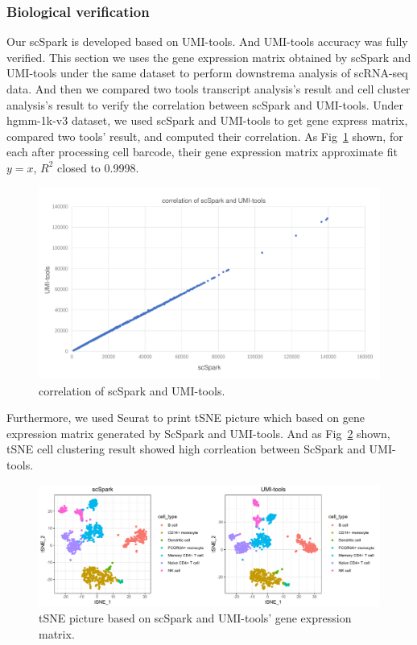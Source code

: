\documentclass[runningheads]{llncs}
\begin{document}
\subsubsection{Biological verification}
Our scSpark is developed based on UMI-tools.
And UMI-tools accuracy was fully verified.
This section we uses the gene expression matrix obtained by scSpark and UMI-tools under the same dataset to perform downstrema analysis of scRNA-seq data.
And then we compared two tools transcript analysis's result and cell cluster analysis's result to verify the correlation between scSpark and UMI-tools.
Under hgmm-1k-v3 dataset, we used scSpark and UMI-tools to get gene express matrix, compared two tools' result, and computed their correlation.
As Fig~\ref{fig9} shown, for each after processing cell barcode, their gene expression matrix approximate fit $y=x$, $R^{2}$ closed to 0.9998.
\begin{figure}
  \includegraphics[width=\textwidth]{fig9.pdf}
  \caption{correlation of scSpark and UMI-tools.} \label{fig9}
\end{figure}
Furthermore, we used Seurat to print tSNE picture which based on gene expression matrix generated by ScSpark and UMI-tools.
And as Fig~\ref{fig10} shown, tSNE cell clustering result showed high corrleation between ScSpark and UMI-tools.
\begin{figure}
  \includegraphics[width=\textwidth]{fig10.pdf}
  \caption{tSNE picture based on scSpark and UMI-tools' gene expression matrix.} \label{fig10}
\end{figure}
\end{document}
